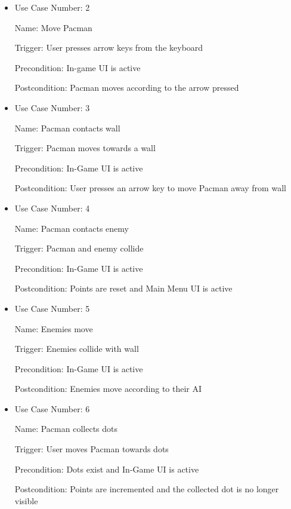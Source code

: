 \documentclass[12pt, titlepage]{article}
\begin{document}
\begin{itemize}
\item
Use Case Number: 2

Name: Move Pacman

Trigger: User presses arrow keys from the keyboard

Precondition: In-game UI is active

Postcondition: Pacman moves according to the arrow pressed
\end{itemize}

\begin{itemize}
\item
Use Case Number: 3

Name: Pacman contacts wall

Trigger: Pacman moves towards a wall

Precondition: In-Game UI is active

Postcondition: User presses an arrow key to move Pacman away from wall

\end{itemize}

\begin{itemize}
\item
Use Case Number: 4

Name: Pacman contacts enemy

Trigger: Pacman and enemy collide

Precondition: In-Game UI is active

Postcondition: Points are reset and Main Menu UI is active
\end{itemize}

\begin{itemize}
\item
Use Case Number: 5

Name: Enemies move

Trigger: Enemies collide with wall

Precondition: In-Game UI is active

Postcondition: Enemies move according to their AI
\end{itemize}

\begin{itemize}
\item
Use Case Number: 6

Name: Pacman collects dots

Trigger: User moves Pacman towards dots

Precondition: Dots exist and In-Game UI is active

Postcondition: Points are incremented and the collected dot is no longer visible
\end{itemize}
\end{document}
